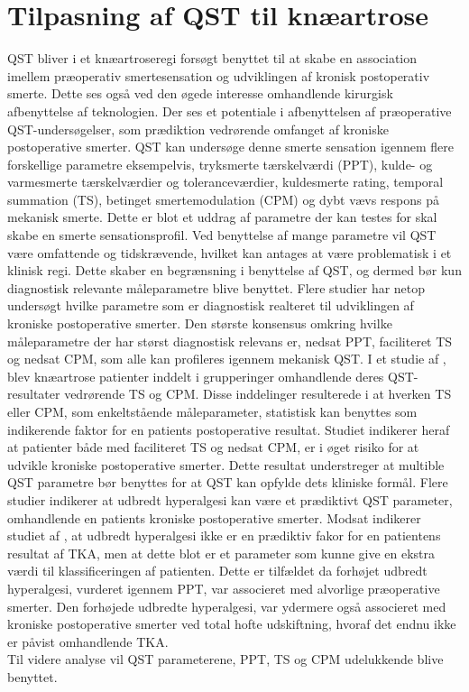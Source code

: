 \section{Tilpasning af QST til knæartrose}
QST bliver i et knæartroseregi forsøgt benyttet til at skabe en association imellem præoperativ smertesensation og udviklingen af kronisk postoperativ smerte. Dette ses også ved den øgede interesse omhandlende kirurgisk afbenyttelse af teknologien. Der ses et potentiale i afbenyttelsen af præoperative QST-undersøgelser, som prædiktion vedrørende omfanget af kroniske postoperative smerter. \citep{Wylde2013} \citep{Lunn2013} QST kan undersøge denne smerte sensation igennem flere forskellige parametre eksempelvis, tryksmerte tærskelværdi (PPT), kulde- og varmesmerte tærskelværdier og toleranceværdier, kuldesmerte rating, temporal summation (TS), betinget smertemodulation (CPM) og dybt vævs respons på mekanisk smerte. \citep{Cornelius2015} Dette er blot et uddrag af parametre der kan testes for skal skabe en smerte sensationsprofil. Ved benyttelse af mange parametre vil QST være omfattende og tidskrævende, hvilket kan antages at være problematisk i et klinisk regi. Dette skaber en begrænsning i benyttelse af QST, og dermed bør kun diagnostisk relevante måleparametre blive benyttet. \citep{Lunn2013} Flere studier har netop undersøgt hvilke parametre som er diagnostisk realteret til udviklingen af kroniske postoperative smerter. Den største konsensus omkring hvilke måleparametre der har størst diagnostisk relevans er, nedsat PPT, faciliteret TS og nedsat CPM, som alle kan profileres igennem mekanisk QST. \citep{Petersen2015} \citep{Petersen2016} \citep{Wylde2015} I et studie af , blev knæartrose patienter inddelt i grupperinger omhandlende deres QST-resultater vedrørende TS og CPM. Disse inddelinger resulterede i at hverken TS eller CPM, som enkeltstående måleparameter, statistisk kan benyttes som indikerende faktor for en patients postoperative resultat. Studiet indikerer heraf at patienter både med faciliteret TS og nedsat CPM, er i øget risiko for at udvikle kroniske postoperative smerter. Dette resultat understreger at multible QST parametre bør benyttes for at QST kan opfylde dets kliniske formål. \citep{Petersen2016} Flere studier indikerer at udbredt hyperalgesi kan være et prædiktivt QST parameter, omhandlende en patients kroniske postoperative smerter. \citep{Petersen2016} \citep{Wylde2013} Modsat indikerer studiet af , at udbredt hyperalgesi ikke er en prædiktiv fakor for en patientens resultat af TKA, men at dette blot er et parameter som kunne give en ekstra værdi til klassificeringen af patienten. Dette er tilfældet da forhøjet udbredt hyperalgesi, vurderet igennem PPT, var associeret med alvorlige præoperative smerter. Den forhøjede udbredte hyperalgesi, var ydermere også associeret med kroniske postoperative smerter ved total hofte udskiftning, hvoraf det endnu ikke er påvist omhandlende TKA. \citep{Wylde2015} \\
Til videre analyse vil QST parameterene, PPT, TS og CPM udelukkende blive benyttet. 